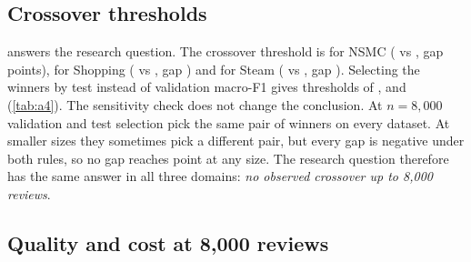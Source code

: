 \subsection{Crossover thresholds}

\begin{table}
  \centering
  \caption{Crossover threshold and cost by dataset. Winners are chosen per size by
  validation macro-F1; the threshold is the smallest size where the mean paired test
  macro-F1 gap (neural $-$ TF-IDF, points) is at least \crossoverMargin. Gap and costs
  are reported at the threshold, or at $n=8{,}000$ when there is no crossover. \pmnote{}
  ``Pareto'': the neural winner is not dominated by the TF-IDF winner on (macro-F1,
  CPU latency, fit time, peak RAM).}
  \label{tab:crossover}
  
\end{table}

 answers the research question. The crossover threshold is
\crossoverNSMC{} for NSMC (\bestNeuralNSMC{} vs \bestTfidfNSMC, gap \gapNSMC{} points),
\crossoverShopping{} for Shopping (\bestNeuralShopping{} vs \bestTfidfShopping, gap
\gapShopping) and \crossoverSteam{} for Steam (\bestNeuralSteam{} vs \bestTfidfSteam,
gap \gapSteam). Selecting the winners by test instead of validation macro-F1 gives
thresholds of \crossoverTestSelNSMC, \crossoverTestSelShopping{} and
\crossoverTestSelSteam{} (\cref{tab:a4}). The sensitivity check does not change the conclusion. At $n=8{,}000$ validation and test
selection pick the same pair of winners on every dataset. At smaller sizes they sometimes
pick a different pair, but every gap is negative under both rules, so no gap reaches
\crossoverMargin{} point at any size. The research question therefore has the same answer in all three domains:
\emph{no observed crossover up to 8{,}000 reviews}.

\subsection{Quality and cost at 8,000 reviews}

\begin{table}[t]
  \centering
  \caption{Predictive quality at $n=8{,}000$ ($\times100$; from the parallel quality runs).
  \pmnote{} Bold: best per column within a dataset.}
  \label{tab:quality8k}
  
\end{table}

